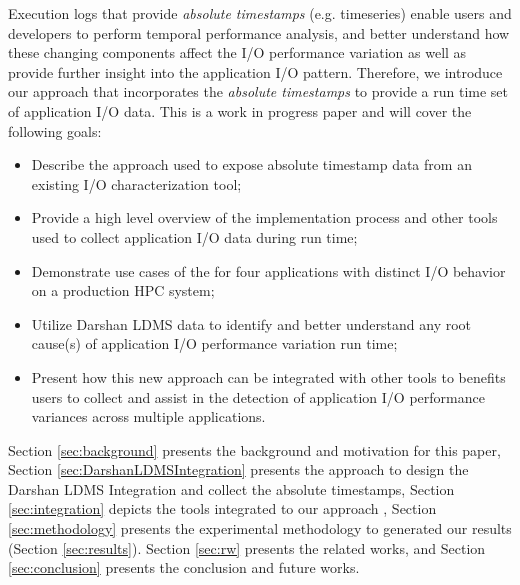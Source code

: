 
Execution logs that provide \emph{absolute timestamps}
(e.g. timeseries) enable users and developers to perform temporal
performance analysis, and better understand how these changing
components affect the I/O performance variation as well as provide
further insight into the application I/O pattern. Therefore, we
introduce our \Darshan approach that incorporates the \emph{absolute
  timestamps} to provide a run time set of application I/O data. This
is a work in progress paper and will cover the following goals:

\begin{itemize}
	\item Describe the approach used to expose absolute timestamp
          data from an existing I/O characterization tool;
       	\item Provide a high level overview of the implementation
          process and other tools used to collect application I/O data
          during run time;
       	\item Demonstrate use cases of the \connector for four
          applications with distinct I/O behavior on a production HPC
          system;
        \item Utilize Darshan LDMS data to identify and better
          understand any root cause(s) of application I/O performance
          variation run time;
	\item Present how this new approach can be integrated with
          other tools to benefits users to collect and assist in the
          detection of application I/O performance variances across
          multiple applications.
\end{itemize}

Section \ref{sec:background} presents the background and motivation
for this paper, Section \ref{sec:DarshanLDMSIntegration} presents the
approach to design the Darshan LDMS Integration and collect the
absolute timestamps, Section \ref{sec:integration} depicts the tools
integrated to our approach , Section \ref{sec:methodology} presents
the experimental methodology to generated our results (Section
\ref{sec:results}). Section \ref{sec:rw} presents the related works,
and Section \ref{sec:conclusion} presents the conclusion and future
works.
